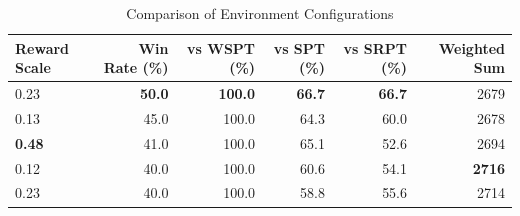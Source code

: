 \begin{table}[htbp]%
\centering%
\begin{tabular}{lrrrrr}%
\toprule%
\textbf{Reward Scale}&\textbf{Win Rate (\%)}&\textbf{vs WSPT (\%)}&\textbf{vs SPT (\%)}&\textbf{vs SRPT (\%)}&\textbf{Weighted Sum}\\%
\midrule%
0.23&\textbf{50.0}&\textbf{100.0}&\textbf{66.7}&\textbf{66.7}&2679\\%
0.13&45.0&100.0&64.3&60.0&2678\\%
\textbf{0.48}&41.0&100.0&65.1&52.6&2694\\%
0.12&40.0&100.0&60.6&54.1&\textbf{2716}\\%
0.23&40.0&100.0&58.8&55.6&2714\\%
\bottomrule%
\end{tabular}%
\caption{Comparison of Environment Configurations}%
\label{tab:environment}%
\end{table}